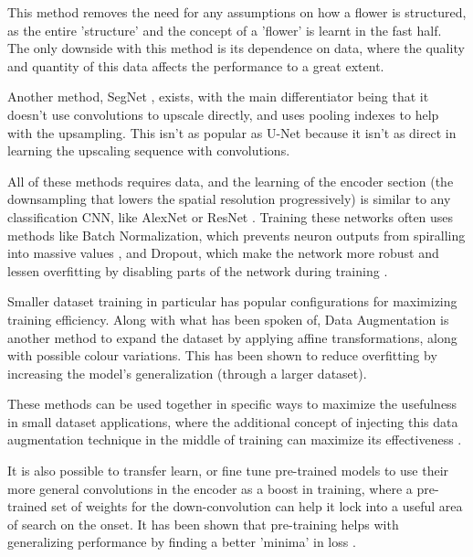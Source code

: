 \documentclass{article}
\begin{document}
This method removes the need for any assumptions on how a flower is structured, as the entire 'structure' and the concept of a 'flower' is learnt in the fast half. The only downside with this method is its dependence on data, where the quality and quantity of this data affects the performance to a great extent. 

Another method, SegNet \autocite{badrinarayananSegNetDeepConvolutional2017}, exists, with the main differentiator being that it doesn't use convolutions to upscale directly, and uses pooling indexes to help with the upsampling. This isn't as popular as U-Net because it isn't as direct in learning the upscaling sequence with convolutions. 

All of these methods requires data, and the learning of the encoder section (the downsampling that lowers the spatial resolution progressively) is similar to any classification CNN, like AlexNet or ResNet \autocite{krizhevskyImageNetClassificationDeep2012,heDeepResidualLearning2016}. Training these networks often uses methods like Batch Normalization, which prevents neuron outputs from spiralling into massive values \autocite{ioffeBatchNormalizationAccelerating2015}, and Dropout, which make the network more robust and lessen overfitting by disabling parts of the network during training \autocite{srivastavaDropoutSimpleWay2014}. 

Smaller dataset training in particular has popular configurations for maximizing training efficiency. Along with what has been spoken of, Data Augmentation is another method to expand the dataset by applying affine transformations, along with possible colour variations. This has been shown to reduce overfitting \autocite{shortenSurveyImageData2019} by increasing the model's generalization (through a larger dataset).

These methods can be used together in specific ways to maximize the usefulness in small dataset applications, where the additional concept of injecting this data augmentation technique in the middle of training can maximize its effectiveness \autocite{thanapolReducingOverfittingImproving2020}. 

It is also possible to transfer learn, or fine tune pre-trained models to use their more general convolutions in the encoder as a boost in training, where a pre-trained set of weights for the down-convolution can help it lock into a useful area of search on the onset. It has been shown that pre-training helps with generalizing performance by finding a better 'minima' in loss \autocite{pmlr-v9-erhan10a}.
\end{document}
